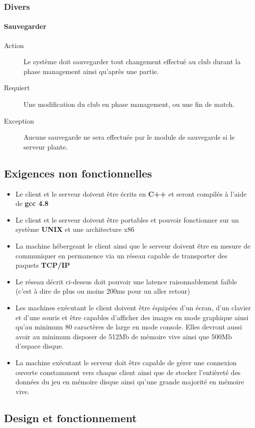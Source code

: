 \documentclass[a4paper]{article}
\begin{document}
\subsubsection{Divers}
\paragraph{Sauvegarder}
\begin{description}
\item[Action] Le système doit sauvegarder tout changement effectué au \gls{club} durant la phase management ainsi qu'après une partie.
\item[Requiert] Une modification du \gls{club} en phase management, ou une fin de match.
\item[Exception] Aucune sauvegarde ne sera effectuée par le module de sauvegarde si le \gls{serveur} plante.
\end{description}


\subsection{Exigences non fonctionnelles}
\label{enf}
\begin{itemize}
\item Le \gls{client} et le \gls{serveur} doivent être écrits en \textbf{C++} et seront compilés à l'aide de \textbf{gcc 4.8}
\item Le \gls{client} et le \gls{serveur} doivent être portables et pouvoir fonctionner sur un système \textbf{UNIX} et une architecture x86
\item La machine hébergeant le \gls{client} ainsi que le \gls{serveur} doivent être en mesure de communiquer en permanence via un réseau capable de transporter des paquets \textbf{TCP/IP}
\item Le réseau décrit ci-dessus doit pouvoir une latence raisonnablement faible (c'est à dire de plus ou moins 200ms pour un aller retour)
\item Les machines exécutant le \gls{client} doivent être équipées d'un écran, d'un clavier et d'une souris et être capables d'afficher des images en mode graphique ainsi qu'au minimum 80 caractères de large en mode console. Elles devront aussi avoir au minimum disposer de 512Mb de mémoire vive ainsi que 500Mb d'espace disque.
\item La machine exécutant le \gls{serveur} doit être capable de gérer une connexion ouverte constamment vers chaque \gls{client} ainsi que de stocker l'entièreté des données du jeu en mémoire disque ainsi qu'une grande majorité en mémoire vive.
\end{itemize}

\subsection{Design et fonctionnement}

\printindex
\tableofcontents
\listoffigures
\end{document}
